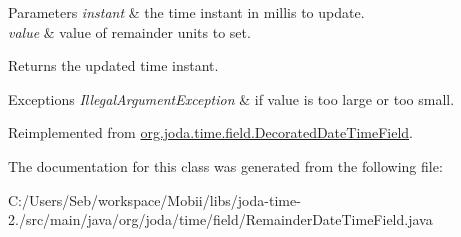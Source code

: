 \begin{DoxyParams}{Parameters}
{\em instant} & the time instant in millis to update. \\
\hline
{\em value} & value of remainder units to set. \\
\hline
\end{DoxyParams}
\begin{DoxyReturn}{Returns}
the updated time instant. 
\end{DoxyReturn}

\begin{DoxyExceptions}{Exceptions}
{\em Illegal\-Argument\-Exception} & if value is too large or too small. \\
\hline
\end{DoxyExceptions}


Reimplemented from \hyperlink{classorg_1_1joda_1_1time_1_1field_1_1_decorated_date_time_field_a2c48e6d5c609215a6b33049feb869f7a}{org.\-joda.\-time.\-field.\-Decorated\-Date\-Time\-Field}.



The documentation for this class was generated from the following file\-:\begin{DoxyCompactItemize}
\item 
C\-:/\-Users/\-Seb/workspace/\-Mobii/libs/joda-\/time-\/2./src/main/java/org/joda/time/field/Remainder\-Date\-Time\-Field.\-java\end{DoxyCompactItemize}
